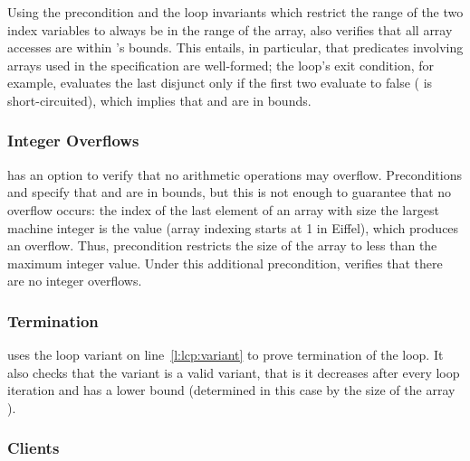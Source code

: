 Using the precondition and the loop invariants which restrict the range of the two index variables to always be in the range of the array, \AutoProof also verifies that all array accesses are within 's bounds.
This entails, in particular, that predicates involving arrays used in the specification are well-formed; the loop's exit condition, for example, evaluates the last disjunct only if the first two evaluate to false ( is short-circuited), which implies that  and  are in bounds.


\subsubsection{Integer Overflows}

\AutoProof has an option to verify that no arithmetic operations may overflow.
Preconditions  and  specify that  and  are in bounds, but this is not enough to guarantee that no overflow occurs: the index of the last element of an array with size the largest machine integer  is the value  (array indexing starts at 1 in Eiffel), which produces an overflow.
Thus, precondition  restricts the size of the array to less than the maximum integer value.
Under this additional precondition, \AutoProof verifies that there are no integer overflows.


\subsubsection{Termination}

\AutoProof uses the loop variant on line~\ref{l:lcp:variant} to prove termination of the loop.
It also checks that the variant is a valid variant, that is it decreases after every loop iteration and has a lower bound (determined in this case by the size of the array ).


\subsubsection{Clients}

